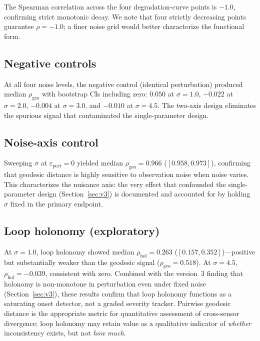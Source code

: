 \documentclass[11pt]{article}
\newcommand{\eps}{\varepsilon}
\newcommand{\epspert}{\eps_\mathrm{pert}}
\newcommand{\rhogeo}{\rho_\mathrm{geo}}
\newcommand{\rhohol}{\rho_\mathrm{hol}}
\begin{document}
The Spearman correlation across the four degradation-curve points is
$-1.0$, confirming strict monotonic decay.  We note that four
strictly decreasing points guarantee $\rho = -1.0$; a finer noise
grid would better characterize the functional form.

\subsection{Negative controls}

At all four noise levels, the negative control (identical
perturbation) produced median $\rhogeo$ with bootstrap CIs
including zero: $0.050$ at $\sigma = 1.0$, $-0.022$ at
$\sigma = 2.0$, $-0.004$ at $\sigma = 3.0$, and $-0.010$ at
$\sigma = 4.5$.  The two-axis design eliminates the spurious
signal that contaminated the single-parameter design.

\subsection{Noise-axis control}

Sweeping $\sigma$ at $\epspert = 0$ yielded median $\rhogeo =
0.966$ ($[0.958, 0.973]$), confirming that geodesic distance is
highly sensitive to observation noise when noise varies.  This
characterizes the nuisance axis: the very effect that confounded
the single-parameter design (Section~\ref{sec:v3}) is documented
and accounted for by holding $\sigma$ fixed in the primary
endpoint.

\subsection{Loop holonomy (exploratory)}

At $\sigma = 1.0$, loop holonomy showed median $\rhohol = 0.263$
($[0.157, 0.352]$)---positive but substantially weaker than the
geodesic signal ($\rhogeo = 0.518$).  At $\sigma = 4.5$,
$\rhohol = -0.039$, consistent with zero.  Combined with the
version~3 finding that holonomy is non-monotone in perturbation
even under fixed noise (Section~\ref{sec:v3}), these results
confirm that loop holonomy functions as a saturating onset
detector, not a graded severity tracker.  Pairwise geodesic
distance is the appropriate metric for quantitative assessment of
cross-sensor divergence; loop holonomy may retain value as a
qualitative indicator of \emph{whether} inconsistency exists, but
not \emph{how much}.

\end{document}
